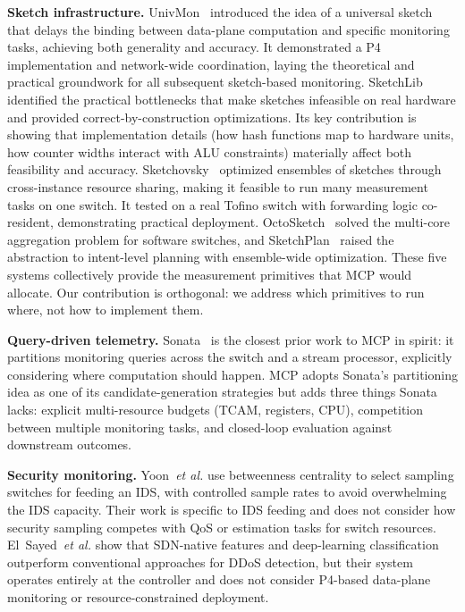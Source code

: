 \documentclass[letterpaper,twocolumn,10pt]{article}
\newcommand{\system}{MCP\xspace}
\newcommand{\etal}{\textit{et al.}\xspace}
\newcommand{\para}[1]{\smallskip\noindent\textbf{#1.}}
\begin{document}
\para{Sketch infrastructure}
UnivMon~\cite{liu2016univmon} introduced the idea of a universal
sketch that delays the binding between data-plane computation and
specific monitoring tasks, achieving both generality and
accuracy. It demonstrated a P4 implementation and network-wide
coordination, laying the theoretical and practical groundwork for
all subsequent sketch-based monitoring.
SketchLib~\cite{namkung2022sketchlib} identified the practical
bottlenecks that make sketches infeasible on real hardware and
provided correct-by-construction optimizations. Its key
contribution is showing that implementation details (how hash
functions map to hardware units, how counter widths interact with
ALU constraints) materially affect both feasibility and accuracy.
Sketchovsky~\cite{namkung2023sketchovsky} optimized ensembles of
sketches through cross-instance resource sharing, making it
feasible to run many measurement tasks on one switch. It tested
on a real Tofino switch with forwarding logic co-resident,
demonstrating practical deployment.
OctoSketch~\cite{zhang2024octosketch} solved the multi-core
aggregation problem for software switches, and
SketchPlan~\cite{srivastava2024sketchplan} raised the
abstraction to intent-level planning with ensemble-wide
optimization. These five systems collectively provide the
measurement primitives that \system would allocate. Our
contribution is orthogonal: we address which primitives to run
where, not how to implement them.

\para{Query-driven telemetry}
Sonata~\cite{gupta2018sonata} is the closest prior work to
\system in spirit: it partitions monitoring queries across the
switch and a stream processor, explicitly considering where
computation should happen. \system adopts Sonata's partitioning
idea as one of its candidate-generation strategies but adds three
things Sonata lacks: explicit multi-resource budgets (TCAM,
registers, CPU), competition between multiple monitoring tasks,
and closed-loop evaluation against downstream outcomes.

\para{Security monitoring}
Yoon~\etal\cite{yoon2017sampling} use betweenness centrality to
select sampling switches for feeding an IDS, with controlled
sample rates to avoid overwhelming the IDS capacity. Their work
is specific to IDS feeding and does not consider how security
sampling competes with QoS or estimation tasks for switch
resources.
El~Sayed~\etal\cite{elsayed2022ddos} show that SDN-native
features and deep-learning classification outperform conventional
approaches for DDoS detection, but their system operates entirely
at the controller and does not consider P4-based data-plane
monitoring or resource-constrained deployment.
\end{document}
